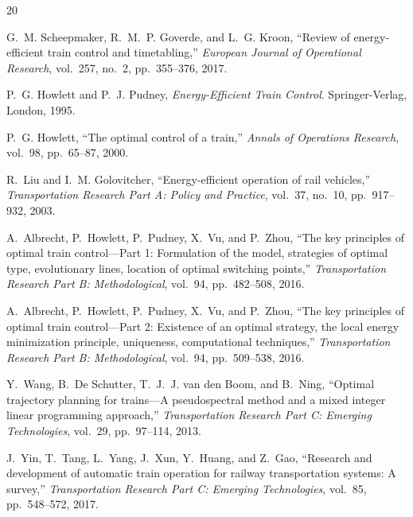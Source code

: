 \documentclass[11pt,a4paper]{article}
\begin{document}
\begin{thebibliography}{20}\small

G.~M. Scheepmaker, R.~M.~P. Goverde, and L.~G. Kroon,
``Review of energy-efficient train control and timetabling,''
\emph{European Journal of Operational Research}, vol.~257, no.~2,
pp.~355--376, 2017.

P.~G. Howlett and P.~J. Pudney,
\emph{Energy-Efficient Train Control}.
Springer-Verlag, London, 1995.

P.~G. Howlett,
``The optimal control of a train,''
\emph{Annals of Operations Research}, vol.~98, pp.~65--87, 2000.

R.~Liu and I.~M. Golovitcher,
``Energy-efficient operation of rail vehicles,''
\emph{Transportation Research Part A: Policy and Practice}, vol.~37,
no.~10, pp.~917--932, 2003.

A.~Albrecht, P.~Howlett, P.~Pudney, X.~Vu, and P.~Zhou,
``The key principles of optimal train control---Part 1: Formulation of the
model, strategies of optimal type, evolutionary lines, location of optimal
switching points,''
\emph{Transportation Research Part B: Methodological}, vol.~94,
pp.~482--508, 2016.

A.~Albrecht, P.~Howlett, P.~Pudney, X.~Vu, and P.~Zhou,
``The key principles of optimal train control---Part 2: Existence of an
optimal strategy, the local energy minimization principle, uniqueness,
computational techniques,''
\emph{Transportation Research Part B: Methodological}, vol.~94,
pp.~509--538, 2016.

Y.~Wang, B.~De Schutter, T.~J.~J. van den Boom, and B.~Ning,
``Optimal trajectory planning for trains---A pseudospectral method and a
mixed integer linear programming approach,''
\emph{Transportation Research Part C: Emerging Technologies}, vol.~29,
pp.~97--114, 2013.

J.~Yin, T.~Tang, L.~Yang, J.~Xun, Y.~Huang, and Z.~Gao,
``Research and development of automatic train operation for railway
transportation systems: A survey,''
\emph{Transportation Research Part C: Emerging Technologies}, vol.~85,
pp.~548--572, 2017.


\end{thebibliography}
\end{document}
